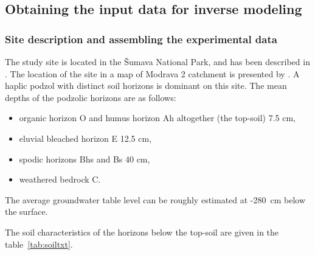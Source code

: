 \documentclass[review]{elsarticle}
\begin{document}
\subsection{Obtaining the input data for inverse modeling}
\label{assamb}


\subsubsection{Site description and assembling the experimental data}%
\label{site}
The study site is located in the \v{S}umava National Park, and has been described in \citep{Jacka1}. The location of the site in a map of Modrava 2 catchment is presented by \cite{Jacka2}.
A haplic podzol with distinct soil horizons is dominant on this site. The mean depths of the podzolic horizons are as follows:
\begin{itemize}
\item organic horizon O and humus horizon Ah altogether (the top-soil) 7.5 cm, 
\item eluvial bleached horizon E 12.5 cm, 
\item spodic horizons Bhs and Bs 40 cm,
\item weathered bedrock C.
\end{itemize}
The average groundwater table level can be roughly estimated at -280~cm below the surface. 

The soil characteristics of the horizons below the top-soil %
are given in the table~\ref{tab:soiltxt}. 

%
\end{document}

